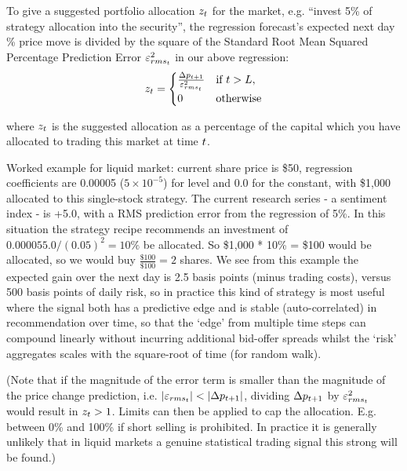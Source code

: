 \documentclass{article}%
\begin{document}
{\vspace{1mm}
\justify To give a suggested portfolio allocation $z_t$ for the market, e.g. ``invest 5\% of strategy allocation into the security'', the regression forecast's expected next day \% price move is divided by the square of the Standard Root Mean Squared Percentage Prediction Error $\varepsilon^{{2}}_{rms_{t}}$ in our above regression:
\vspace{1mm}
\\



\vspace{1mm}
\begin{equation}
    z_t = 
    \begin{cases}
    \frac{\Delta p_{t+1}}{\varepsilon^{{2}}_{rms_{t}}} & \text{if } t > L,\\
    0                                        & \text{otherwise}
    \end{cases}\label{eq:Suggested_Allocation}
\end{equation}



\vspace{1mm}
\justify where $z_t$ is the suggested allocation as a percentage of the capital which you have allocated to trading this market at time $t$.

\justify Worked example for liquid market:  current share price is \$50, regression coefficients are 0.00005 ($5\times 10^{-5}$) for level and 0.0 for the constant, with \$1,000 allocated to this single-stock strategy.  The current research series - a sentiment index - is +5.0, with a RMS prediction error from the regression of 5\%. In this situation the strategy recipe recommends an investment of $0.00005  5.0 / (0.05)^2 = 10\%$ be allocated. So \$1,000 * 10\% = \$100 would be allocated, so we would buy $\frac{\$100}{\$100} = 2$ shares.
We see from this example the expected gain over the next day is 2.5 basis points (minus trading costs), versus 500 basis points of daily risk, so in practice this kind of strategy is most useful where the signal both has a predictive edge and is stable (auto-correlated) in recommendation over time, so that the `edge' from multiple time steps can compound linearly without incurring additional bid-offer spreads whilst the `risk' aggregates scales with the square-root of time (for random walk).


\vspace{1mm}
\justify (Note that if the magnitude of the error term is smaller than the magnitude of the price change prediction, i.e. $|\varepsilon_{rms_{t}}| < |\Delta p_{t+1}|$, dividing $\Delta p_{t+1}$ by $\varepsilon^{{2}}_{rms_{t}}$ would result in $z_t>1$. Limits can then be applied to cap the allocation. E.g. between 0\% and 100\% if short selling is prohibited. In practice it is generally unlikely that in liquid markets a genuine statistical trading signal this strong will be found.)


}
\end{document}
